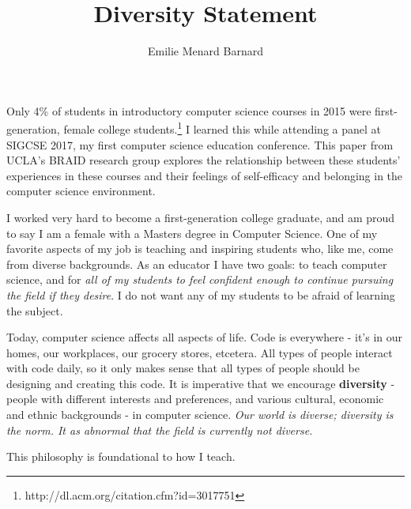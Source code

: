 \documentclass[12pt]{amsart} \usepackage{amssymb}
\title[]{Diversity Statement}
\author[]{Emilie Menard Barnard}
\begin{document}
\maketitle
\thispagestyle{empty}


%
%
%


Only 4\% of students in introductory computer science courses in 2015 were first-generation, female college students.\footnote{http://dl.acm.org/citation.cfm?id=3017751} I learned this while attending a panel at SIGCSE 2017, my first computer science education conference. This paper from UCLA's BRAID research group explores the relationship between these students' experiences in these courses and their feelings of self-efficacy and belonging in the computer science environment. 

I worked very hard to become a first-generation college graduate, and am proud to say I am a female with a Masters degree in Computer Science. One of my favorite aspects of my job is teaching and inspiring students who, like me, come from diverse backgrounds. As an educator I have two goals: to teach computer science, and for \emph{all of my students to feel confident enough to continue pursuing the field if they desire}. I do not want any of my students to be afraid of learning the subject.

Today, computer science affects all aspects of life. Code is everywhere - it's in our homes, our workplaces, our grocery stores, etcetera. All types of people interact with code daily, so it only makes sense that all types of people should be designing and creating this code. It is imperative that we encourage \textbf{diversity} - people with different interests and preferences, and various cultural, economic and ethnic backgrounds - in computer science. \emph{Our world is diverse; diversity is the norm. It as abnormal that the field is currently not diverse.}

This philosophy is foundational to how I teach.



\end{document}
